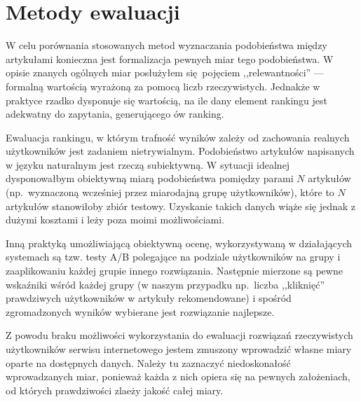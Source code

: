 \documentclass[pl]{minipw} %
\begin{document}
\chapter{Metody ewaluacji}

W celu porównania stosowanych metod wyznaczania podobieństwa między artykułami konieczna jest formalizacja pewnych miar tego podobieństwa. W opisie znanych ogólnych miar posłużyłem się pojęciem ,,relewantności'' --- formalną wartością wyrażoną za pomocą liczb rzeczywistych. Jednakże w praktyce rzadko dysponuje się wartością, na ile dany element rankingu jest adekwatny do zapytania, generującego ów ranking.  

Ewaluacja rankingu, w którym trafność wyników zależy od zachowania realnych użytkowników jest zadaniem nietrywialnym. Podobieństwo artykułów napisanych w języku naturalnym jest rzeczą subiektywną. W sytuacji idealnej dysponowałbym obiektywną miarą podobieństwa pomiędzy parami $N$ artykułów (np.~wyznaczoną wcześniej przez miarodajną grupę użytkowników), które to $N$ artykułów stanowiłoby zbiór testowy. Uzyskanie takich danych wiąże się jednak z dużymi kosztami i leży poza moimi możliwościami.

Inną praktyką umożliwiającą obiektywną ocenę, wykorzystywaną w działających systemach są tzw. testy A/B polegające na podziale użytkowników na grupy i zaaplikowaniu każdej grupie innego rozwiązania. Następnie mierzone są pewne wskaźniki wśród każdej grupy (w naszym przypadku np.~liczba ,,kliknięć'' prawdziwych użytkowników w artykuły rekomendowane) i spośród zgromadzonych wyników wybierane jest rozwiązanie najlepsze.

Z powodu braku możliwości wykorzystania do ewaluacji rozwiązań rzeczywistych użytkowników serwisu internetowego jestem zmuszony wprowadzić własne miary oparte na dostępnych danych. Należy tu zaznaczyć niedoskonałość wprowadzanych miar, ponieważ każda z nich opiera się na pewnych założeniach, od których prawdziwości zlaeży jakość całej miary.
\end{document}
